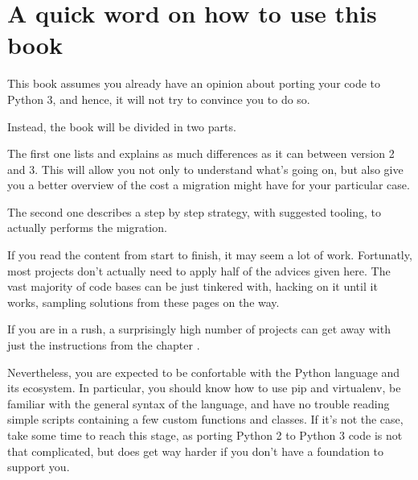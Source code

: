 
\chapter{A quick word on how to use this book}

This book assumes you already have an opinion about porting your code to Python 3, and hence, it will not try to convince you to do so.

Instead, the book will be divided in two parts.

The first one lists and explains as much differences as it can between version 2 and 3. This will allow you not only to understand what's going on, but also give you a better overview of the cost a migration might have for your particular case.

The second one describes a step by step strategy, with suggested tooling, to actually performs the migration.

If you read the content from start to finish, it may seem a lot of work. Fortunatly, most projects  don't actually need to apply half of the advices given here. The vast majority of code bases can be just tinkered with, hacking on it until it works, sampling solutions from these pages on the way.

If you are in a rush, a surprisingly high number of projects can get away with just the instructions from the chapter .

\begin{warning}
    Nevertheless, you are expected to be confortable with the Python language and its ecosystem. In particular, you should know how to use pip and virtualenv, be familiar with the general syntax of the language, and have no trouble reading simple scripts containing a few custom functions and classes. If it's not the case, take some time to reach this stage, as porting Python 2 to Python 3 code is not that complicated, but does get way harder if you don't have a  foundation to support you.
\end{warning}
